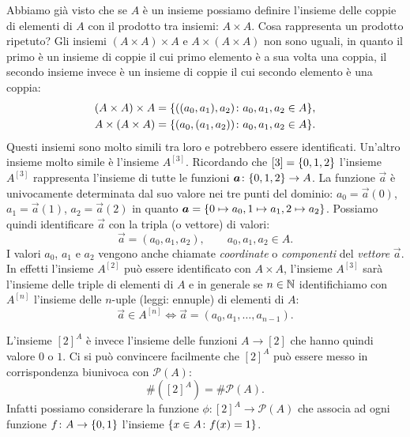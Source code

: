 Abbiamo già visto che se $A$ è un insieme possiamo definire l'insieme 
delle coppie di elementi di $A$ con il prodotto tra insiemi: $A\times A$. 
Cosa rappresenta un prodotto ripetuto?
Gli insiemi $(A\times A)\times A$ e $A\times(A\times A)$ non sono 
uguali, in quanto il primo è un insieme di coppie il cui primo elemento 
è a sua volta una coppia, il secondo insieme invece è un insieme di coppie 
il cui secondo elemento è una coppia:
\begin{gather*}
  (A\times A)\times A = {\left\{ ((a_0,a_1),a_2)\colon a_0,a_1,a_2\in A \right\}},
  \\
  A \times (A\times A) = {\left\{ (a_0,(a_1,a_2))\colon a_0,a_1,a_2\in A \right\}}.
\end{gather*}
Questi insiemi sono molto simili tra loro e potrebbero essere identificati.
Un'altro insieme molto simile è l'insieme $A^{[3]}$.  
Ricordando che $[3] = {\left\{ 0,1,2 \right\}}$ l'insieme 
$A^{[3]}$ rappresenta l'insieme di tutte le funzioni $\boldsymbol a\colon {\left\{ 0,1,2 \right\}}\to A$.
La funzione $\vec a$ è univocamente determinata dal suo valore nei 
tre punti del dominio: $a_0 = \vec a(0)$, $a_1=\vec a(1)$, $a_2=\vec a(2)$
in quanto $\boldsymbol a = {\left\{ 0\mapsto a_0, 1\mapsto a_1, 2\mapsto a_2 \right\}}$.
Possiamo quindi identificare $\vec a$ con la tripla (o vettore) di valori:
\[
  \vec a = (a_0, a_1, a_2), \qquad a_0,a_1,a_2 \in A.  
\]
I valori $a_0$, $a_1$ e $a_2$ vengono anche chiamate \emph{coordinate}
o \emph{componenti} del \emph{vettore} $\vec a$.
%
%
%
%
In effetti l'insieme $A^{[2]}$ può essere identificato con $A\times A$, l'insieme 
$A^{[3]}$ sarà l'insieme delle triple di elementi di $A$ e in generale se $n\in{\mathbb N}$ 
identifichiamo con $A^{[n]}$ l'insieme delle $n$-uple (leggi: ennuple) di elementi 
%
di $A$:
\[
   \vec a \in A^{[n]} \iff 
   \vec a = (a_0, a_1, \dots, a_{n-1}).  
\]


L'insieme $[2]^A$ è invece l'insieme delle funzioni $A\to [2]$ che hanno 
quindi valore $0$ o $1$. 
Ci si può convincere facilmente che $[2]^A$ può essere messo in corrispondenza 
biunivoca con $\mathcal P(A)$:
\[
    \# ([2]^A) = \# \mathcal P(A).
\]
Infatti possiamo considerare la funzione $\phi\colon [2]^A \to \mathcal P(A)$
che associa ad ogni funzione $f\colon A\to {\left\{ 0,1 \right\}}$
l'insieme ${\left\{ x\in A \colon f(x)=1 \right\}}$.

